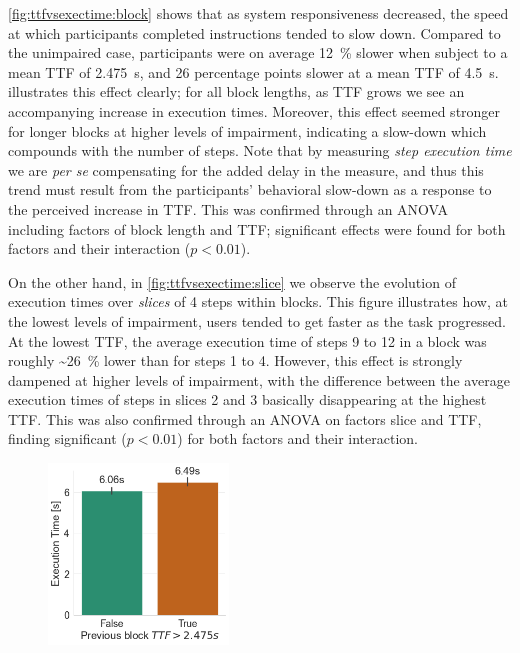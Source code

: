 \cref{fig:ttfvsexectime:block} shows that as system responsiveness decreased, the speed at which participants completed instructions tended to slow down.
Compared to the unimpaired case, participants were on average \SI{12}{\percent} slower when subject to a mean \gls{TTF} of \SI{2.475}{\second}, and \num{26} percentage points slower at a mean \gls{TTF} of \SI{4.5}{\second}.
 illustrates this effect clearly;
for all block lengths, as \gls{TTF} grows we see an accompanying increase in execution times.
Moreover, this effect seemed stronger for longer blocks at higher levels of impairment, indicating a slow-down which compounds with the number of steps.
Note that by measuring \emph{step execution time} we are \emph{per se} compensating for the added delay in the measure, and thus this trend must result from the participants' behavioral slow-down as a response to the perceived increase in \gls{TTF}.
This was confirmed through an \gls{ANOVA}~\cite{fujikoshi1993two} including factors of block length and \gls{TTF}; significant effects were found for both factors and their interaction (\ensuremath{p < 0.01}).

On the other hand, in \cref{fig:ttfvsexectime:slice} we observe the evolution of execution times over \emph{slices} of \num{4} steps within blocks.
This figure illustrates how, at the lowest levels of impairment, users tended to get faster as the task progressed.
At the lowest \gls{TTF}, the average execution time of steps \num{9} to \num{12} in a block was roughly \textasciitilde\SI{26}{\percent} lower than for steps \num{1} to \num{4}.
However, this effect is strongly dampened at higher levels of impairment, with the difference between the average execution times of steps in slices \num{2} and \num{3} basically disappearing at the highest \gls{TTF}.
This was also confirmed through an \gls{ANOVA} on factors slice and \gls{TTF}, finding significant (\ensuremath{p < 0.01}) for both factors and their interaction.

\begin{figure}
    \centering
    \includegraphics[height=13em]{figs/2021Impact/previousblock_vs_exectime}
    \caption{}\label{fig:prevblockvsexectime}
\end{figure}

